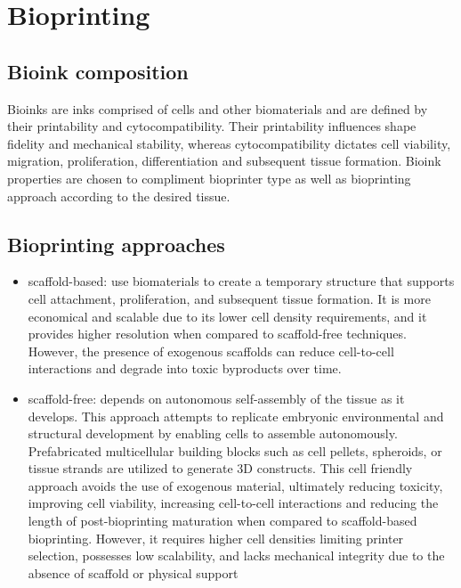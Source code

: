 \chapter{Bioprinting} 

\section{Bioink composition}
Bioinks are inks comprised of cells and other biomaterials and are defined by their printability and cytocompatibility. Their printability influences shape fidelity and mechanical stability, whereas cytocompatibility dictates cell viability, migration, proliferation, differentiation and subsequent tissue formation. Bioink properties are chosen to compliment bioprinter type as well as bioprinting approach according to the desired tissue. 

\section{Bioprinting approaches}
\begin{itemize}
\item scaffold-based: use biomaterials to create a temporary structure that supports cell attachment, proliferation, and subsequent tissue formation. It is more economical and scalable due to its lower cell density requirements, and it provides higher resolution when compared to scaffold-free techniques. However, the presence of exogenous scaffolds can reduce cell-to-cell interactions and degrade into toxic byproducts over time.
\item scaffold-free: depends on autonomous self-assembly of the tissue as it develops. This approach attempts to replicate embryonic environmental and structural development by enabling cells to assemble autonomously. Prefabricated multicellular building blocks such as cell pellets, spheroids, or tissue strands are utilized to generate 3D constructs.  This cell friendly approach avoids the use of exogenous material, ultimately reducing toxicity, improving cell viability, increasing cell-to-cell interactions and reducing the length of post-bioprinting maturation when compared to scaffold-based bioprinting. However, it requires higher cell densities limiting printer selection, possesses low scalability, and lacks mechanical integrity due to the absence of scaffold or physical support 
\end{itemize}

